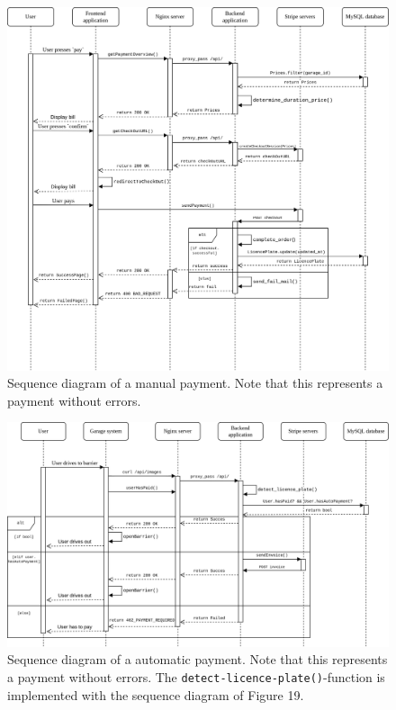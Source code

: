 \begin{figure}[!hpt]
    \centering
    \includegraphics[width=16cm]{images/sequence_diagrams/sequence_diagram_manual_payment.png}
    \caption[Sequence diagram of the manual payment]{Sequence diagram of a manual payment. Note that this represents a payment without errors.}
    \label{fig:manual-payment}
\end{figure}

\begin{figure}[!hpt]
    \centering
    \includegraphics[width=16cm]{images/sequence_diagrams/sequence_diagram-automatic_payment.jpg}
    \caption[Sequence diagram of the automatic payment]{Sequence diagram of a automatic payment. Note that this represents a payment without errors. The \texttt{detect-licence-plate()}-function is implemented with the sequence diagram of Figure 19.}
    \label{fig:automatic-payment}
\end{figure}


\clearpage
